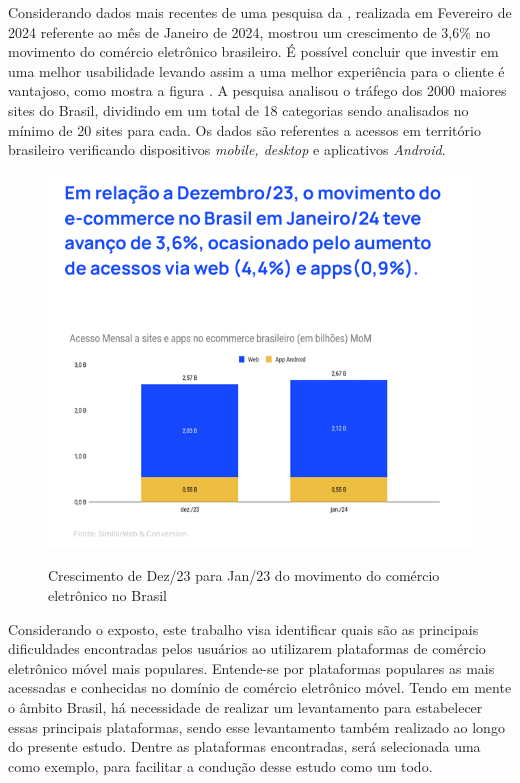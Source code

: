 Considerando dados mais recentes de uma pesquisa da \cite{ConversionDocs}, realizada em Fevereiro de 2024 referente ao mês de Janeiro de 2024, mostrou um crescimento de 3,6\% no movimento do comércio eletrônico brasileiro. É possível concluir que investir em uma melhor usabilidade levando assim a uma melhor experiência para o cliente é vantajoso, como mostra a figura \label{fig04}. A pesquisa analisou o tráfego dos 2000 maiores sites do Brasil, dividindo em um total de 18 categorias sendo analisados no mínimo de 20 sites para cada. Os dados são referentes a acessos em território brasileiro verificando dispositivos \textit{mobile, desktop} e aplicativos \textit{Android}.

\begin{figure}[ht]
    \centering
    \caption{Crescimento de Dez/23 para Jan/23 do movimento do comércio eletrônico no Brasil}
    \includegraphics[keepaspectratio=true,scale=0.6]{figuras/cap02ConversionJan2024.png}
    \label{fig04}
\end{figure}

Considerando o exposto, este trabalho visa identificar quais são as principais dificuldades encontradas pelos usuários ao utilizarem plataformas de comércio eletrônico móvel mais populares. Entende-se por plataformas populares as mais acessadas e conhecidas no domínio de comércio eletrônico móvel. Tendo em mente o âmbito Brasil, há necessidade de realizar um levantamento para estabelecer essas principais plataformas, sendo esse levantamento também realizado ao longo do presente estudo. Dentre as plataformas encontradas, será selecionada uma como exemplo, para facilitar a condução desse estudo como um todo.

